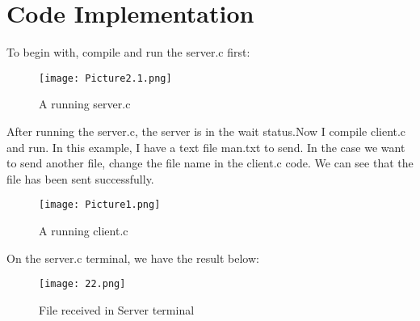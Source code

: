 \documentclass{article}
\begin{document}
\section{Code Implementation}
To begin with, compile and run the server.c first:
\begin{figure}[H]
    \centering
    \texttt{[image: Picture2.1.png]}
    \caption{A running server.c}
\end{figure}
After running the server.c, the server is in the wait status.Now I compile client.c and run. In this example, I have a text file man.txt to send. In the case we want to send another file, change the file name in the client.c code. We can see that the file has been sent successfully.
\begin{figure}[H]
    \centering
    \texttt{[image: Picture1.png]}
    \caption{A running client.c}
\end{figure}
On the server.c terminal, we have the result below:
\begin{figure}[H]
    \centering
    \texttt{[image: 22.png]}
    \caption{File received in Server terminal}
\end{figure}
\end{document}
